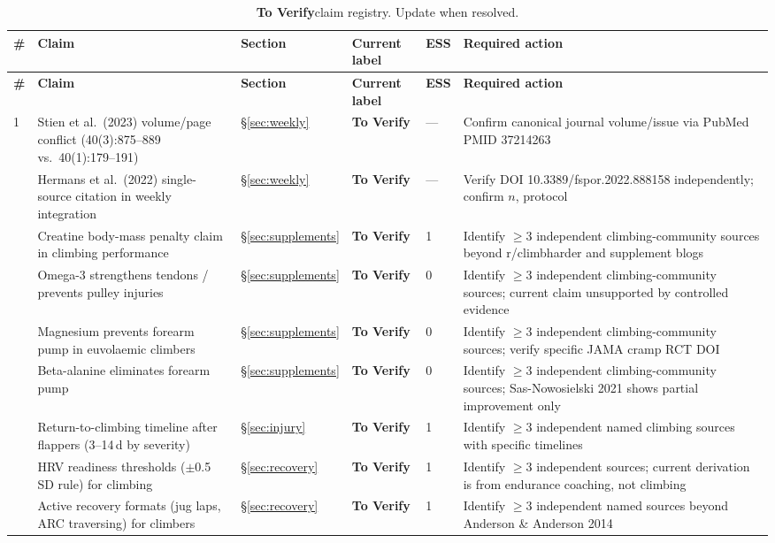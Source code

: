 \documentclass[12pt,a4paper]{article}
\newcommand{\toverify}{\textbf{To Verify}}
\begin{document}
\renewcommand{\arraystretch}{1.2}
\begin{longtable}{>{\raggedright}p{0.5cm}
                  >{\raggedright}p{4.0cm}
                  >{\raggedright}p{2.2cm}
                  >{\raggedright}p{2.2cm}
                  >{\raggedright}p{2.0cm}
                  >{\raggedright\arraybackslash}p{3.5cm}}
\caption{\toverify claim registry. Update when resolved.}\label{tab:toverify}\\
\toprule
\textbf{\#} & \textbf{Claim} & \textbf{Section} & \textbf{Current label} & \textbf{ESS} & \textbf{Required action} \\
\midrule
\endfirsthead
\toprule
\textbf{\#} & \textbf{Claim} & \textbf{Section} & \textbf{Current label} & \textbf{ESS} & \textbf{Required action} \\
\midrule
\endhead
\bottomrule
\endlastfoot

1 & Stien et al.\ (2023) volume/page conflict (40(3):875--889 vs.\ 40(1):179--191) & \S\ref{sec:weekly} & \toverify & --- & Confirm canonical journal volume/issue via PubMed PMID 37214263 \\
\addlinespace
2 & Hermans et al.\ (2022) single-source citation in weekly integration & \S\ref{sec:weekly} & \toverify & --- & Verify DOI 10.3389/fspor.2022.888158 independently; confirm $n$, protocol \\
\addlinespace
3 & Creatine body-mass penalty claim in climbing performance & \S\ref{sec:supplements} & \toverify & 1 & Identify $\geq$3 independent climbing-community sources beyond r/climbharder and supplement blogs \\
\addlinespace
4 & Omega-3 strengthens tendons / prevents pulley injuries & \S\ref{sec:supplements} & \toverify & 0 & Identify $\geq$3 independent climbing-community sources; current claim unsupported by controlled evidence \\
\addlinespace
5 & Magnesium prevents forearm pump in euvolaemic climbers & \S\ref{sec:supplements} & \toverify & 0 & Identify $\geq$3 independent climbing-community sources; verify specific JAMA cramp RCT DOI \\
\addlinespace
6 & Beta-alanine eliminates forearm pump & \S\ref{sec:supplements} & \toverify & 0 & Identify $\geq$3 independent climbing-community sources; Sas-Nowosielski 2021 shows partial improvement only \\
\addlinespace
7 & Return-to-climbing timeline after flappers (3--14\,d by severity) & \S\ref{sec:injury} & \toverify & 1 & Identify $\geq$3 independent named climbing sources with specific timelines \\
\addlinespace
8 & HRV readiness thresholds ($\pm$0.5 SD rule) for climbing & \S\ref{sec:recovery} & \toverify & 1 & Identify $\geq$3 independent sources; current derivation is from endurance coaching, not climbing \\
\addlinespace
9 & Active recovery formats (jug laps, ARC traversing) for climbers & \S\ref{sec:recovery} & \toverify & 1 & Identify $\geq$3 independent named sources beyond Anderson \& Anderson 2014 \\

\end{longtable}



\end{document}
